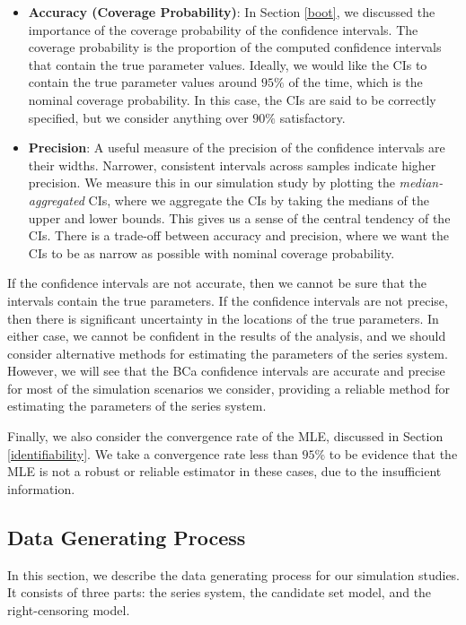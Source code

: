 \documentclass[
]{article}
\theoremstyle{definition}
\theoremstyle{plain}
\theoremstyle{definition}
\theoremstyle{definition}
\theoremstyle{definition}
\theoremstyle{definition}
\theoremstyle{remark}
\begin{document}
\begin{itemize}
\item
  \textbf{Accuracy (Coverage Probability)}: In Section \ref{boot}, we discussed
  the importance of the coverage probability of the confidence intervals. The
  coverage probability is the proportion of the computed confidence intervals
  that contain the true parameter values. Ideally, we would like the CIs to
  contain the true parameter values around \(95\%\) of the time, which is the
  nominal coverage probability. In this case, the CIs are said to be
  correctly specified, but we consider anything over \(90\%\) satisfactory.
\item
  \textbf{Precision}: A useful measure of the precision of the confidence intervals
  are their widths. Narrower, consistent intervals across samples indicate
  higher precision. We measure this in our simulation study by plotting the
  \emph{median-aggregated} CIs, where we aggregate the CIs by taking the medians of
  the upper and lower bounds. This gives us a sense of the central tendency
  of the CIs. There is a trade-off between accuracy and precision, where we
  want the CIs to be as narrow as possible with nominal coverage probability.
\end{itemize}

If the confidence intervals are not accurate, then we cannot be sure that the
intervals contain the true parameters. If the confidence intervals are not
precise, then there is significant uncertainty in the locations of the true
parameters. In either case, we cannot be confident in the results of the
analysis, and we should consider alternative methods for estimating the
parameters of the series system. However, we will see that the BCa confidence
intervals are accurate and precise for most of the simulation scenarios we
consider, providing a reliable method for estimating the parameters of the
series system.

Finally, we also consider the convergence rate of the MLE, discussed in
Section \ref{identifiability}. We take a convergence rate less than \(95\%\) to
be evidence that the MLE is not a robust or reliable estimator in these cases,
due to the insufficient information.

\hypertarget{data-gen-proc}{%
\subsection{Data Generating Process}\label{data-gen-proc}}

In this section, we describe the data generating process for our simulation studies.
It consists of three parts: the series system, the candidate set model, and the
right-censoring model.
\end{document}
